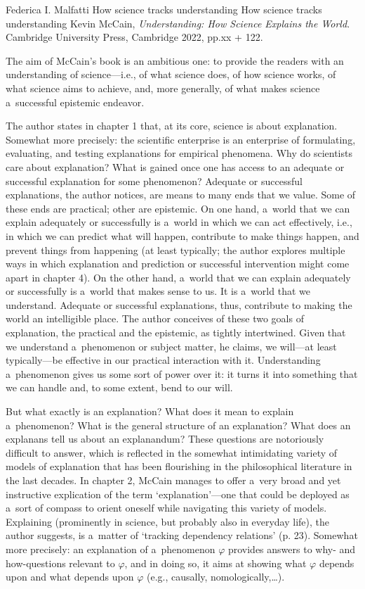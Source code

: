 \begin{recengenv}{Federica I. Malfatti}
	{How science tracks understanding}
	{How science tracks understanding}
	{Kevin McCain, \textit{Understanding: How Science Explains the World}. Cambridge University Press, Cambridge 2022, pp.xx + 122.}



\noindent The aim of McCain's book is an ambitious one: to provide the readers with an understanding of science---i.e., of what science does, of how science works, of what science aims to achieve, and, more generally, of what makes science a~successful epistemic endeavor.

The author states in chapter 1 that, at its core, science is about explanation. Somewhat more precisely: the scientific enterprise is an enterprise of formulating, evaluating, and testing explanations for empirical phenomena. Why do scientists care about explanation? What is gained once one has access to an adequate or successful explanation for some phenomenon? Adequate or successful explanations, the author notices, are means to many ends that we value. Some of these ends are practical; other are epistemic. On one hand, a~world that we can explain adequately or successfully is a~world in which we can act effectively, i.e., in which we can predict what will happen, contribute to make things happen, and prevent things from happening (at least typically; the author explores multiple ways in which explanation and prediction or successful intervention might come apart in chapter 4). On the other hand, a~world that we can explain adequately or successfully is a~world that makes sense to us. It is a~world that we understand. Adequate or successful explanations, thus, contribute to making the world an intelligible place. The author conceives of these two goals of explanation, the practical and the epistemic, as tightly intertwined. Given that we understand a~phenomenon or subject matter, he claims, we will---at least typically---be effective in our practical interaction with it. Understanding a~phenomenon gives us some sort of power over it: it turns it into something that we can handle and, to some extent, bend to our will.

But what exactly is an explanation? What does it mean to explain a~phenomenon? What is the general structure of an explanation? What does an explanans tell us about an explanandum? These questions are notoriously difficult to answer, which is reflected in the somewhat intimidating variety of models of explanation that has been flourishing in the philosophical literature in the last decades. In chapter 2, McCain manages to offer a~very broad and yet instructive explication of the term ‘explanation'---one that could be deployed as a~sort of compass to orient oneself while navigating this variety of models. Explaining (prominently in science, but probably also in everyday life), the author suggests, is a~matter of ‘tracking dependency relations' (p. 23). Somewhat more precisely: an explanation of a~phenomenon $\varphi$ provides answers to why- and how-questions relevant to $\varphi$, and in doing so, it aims at showing what $\varphi$ depends upon and what depends upon $\varphi$ (e.g., causally, nomologically,…).


\end{recengenv}
